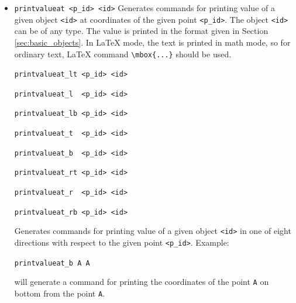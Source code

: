 \documentclass[a4paper]{book}
\begin{document}
\begin{itemize}
\verb|printat_lt <p_id> <text>|

\verb|printat_l  <p_id> <text>|

\verb|printat_lb <p_id> <text>|

\verb|printat_t  <p_id> <text>|

\verb|printat_b  <p_id> <text>|

\verb|printat_rt <p_id> <text>|

\verb|printat_r  <p_id> <text>|

\verb|printat_rb <p_id> <text>|

        Generates commands for printing given text in one of eight directions
        with respect to the given point.
        Example:

        \verb|printat_l A {A=S_a(B) \mbox{($a$ is the bisector of $AB$)}}|

        will generate a command for printing the given text left from the
        point \verb|A|.

\item
\verb|printvalueat <p_id> <id>|
        Generates commands for printing value of a given object \verb|<id>| at
        coordinates of the given point \verb|<p_id>|.
        The object \verb|<id>| can be of any type. The value is printed in
        the format given in Section \ref{sec:basic_objects}.
        In \LaTeX{} mode, the text is printed in math mode, so for
        ordinary text, \LaTeX{} command \verb|\mbox{...}| should be used.

\verb|printvalueat_lt <p_id> <id>|

\verb|printvalueat_l  <p_id> <id>|

\verb|printvalueat_lb <p_id> <id>|

\verb|printvalueat_t  <p_id> <id>|

\verb|printvalueat_b  <p_id> <id>|

\verb|printvalueat_rt <p_id> <id>|

\verb|printvalueat_r  <p_id> <id>|

\verb|printvalueat_rb <p_id> <id>|

        Generates commands for printing value of a given object \verb|<id>| in
        one of eight directions with respect to the given point \verb|<p_id>|.
        Example:

        \verb|printvalueat_b A A|

        will generate a command for printing the coordinates of the point \verb|A|
        on bottom from the point \verb|A|.
\end{itemize}
\end{document}
